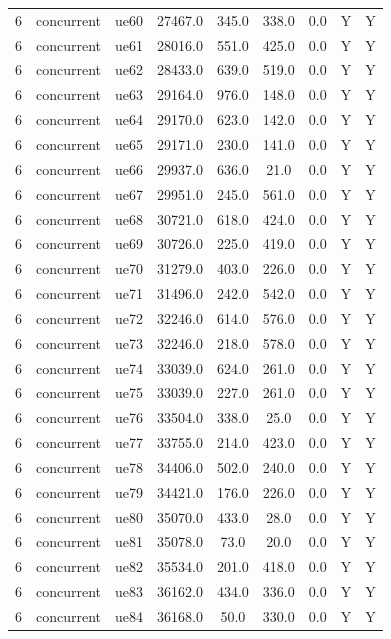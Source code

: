 \begin{table}[ht]
\begin{tabular}{|c|c|c|c|c|c|c|c|c|}
6 & concurrent & ue60 & 27467.0 & 345.0 & 338.0 & 0.0 & Y & Y \\
6 & concurrent & ue61 & 28016.0 & 551.0 & 425.0 & 0.0 & Y & Y \\
6 & concurrent & ue62 & 28433.0 & 639.0 & 519.0 & 0.0 & Y & Y \\
6 & concurrent & ue63 & 29164.0 & 976.0 & 148.0 & 0.0 & Y & Y \\
6 & concurrent & ue64 & 29170.0 & 623.0 & 142.0 & 0.0 & Y & Y \\
6 & concurrent & ue65 & 29171.0 & 230.0 & 141.0 & 0.0 & Y & Y \\
6 & concurrent & ue66 & 29937.0 & 636.0 & 21.0 & 0.0 & Y & Y \\
6 & concurrent & ue67 & 29951.0 & 245.0 & 561.0 & 0.0 & Y & Y \\
6 & concurrent & ue68 & 30721.0 & 618.0 & 424.0 & 0.0 & Y & Y \\
6 & concurrent & ue69 & 30726.0 & 225.0 & 419.0 & 0.0 & Y & Y \\
6 & concurrent & ue70 & 31279.0 & 403.0 & 226.0 & 0.0 & Y & Y \\
6 & concurrent & ue71 & 31496.0 & 242.0 & 542.0 & 0.0 & Y & Y \\
6 & concurrent & ue72 & 32246.0 & 614.0 & 576.0 & 0.0 & Y & Y \\
6 & concurrent & ue73 & 32246.0 & 218.0 & 578.0 & 0.0 & Y & Y \\
6 & concurrent & ue74 & 33039.0 & 624.0 & 261.0 & 0.0 & Y & Y \\
6 & concurrent & ue75 & 33039.0 & 227.0 & 261.0 & 0.0 & Y & Y \\
6 & concurrent & ue76 & 33504.0 & 338.0 & 25.0 & 0.0 & Y & Y \\
6 & concurrent & ue77 & 33755.0 & 214.0 & 423.0 & 0.0 & Y & Y \\
6 & concurrent & ue78 & 34406.0 & 502.0 & 240.0 & 0.0 & Y & Y \\
6 & concurrent & ue79 & 34421.0 & 176.0 & 226.0 & 0.0 & Y & Y \\
6 & concurrent & ue80 & 35070.0 & 433.0 & 28.0 & 0.0 & Y & Y \\
6 & concurrent & ue81 & 35078.0 & 73.0 & 20.0 & 0.0 & Y & Y \\
6 & concurrent & ue82 & 35534.0 & 201.0 & 418.0 & 0.0 & Y & Y \\
6 & concurrent & ue83 & 36162.0 & 434.0 & 336.0 & 0.0 & Y & Y \\
6 & concurrent & ue84 & 36168.0 & 50.0 & 330.0 & 0.0 & Y & Y \\

\end{tabular}
\end{table}

